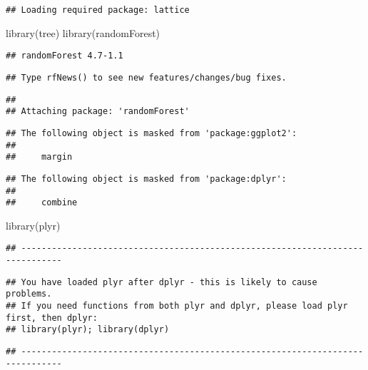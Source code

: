 \documentclass[
]{article}
\newenvironment{Shaded}{\begin{snugshade}}{\end{snugshade}}
\newcommand{\FunctionTok}[1]{\textcolor[rgb]{0.00,0.00,0.00}{#1}}
\newcommand{\NormalTok}[1]{#1}
\begin{document}
\begin{verbatim}
## Loading required package: lattice
\end{verbatim}

\begin{Shaded}
\begin{Highlighting}[]
\FunctionTok{library}\NormalTok{(tree)}
\FunctionTok{library}\NormalTok{(randomForest)}
\end{Highlighting}
\end{Shaded}

\begin{verbatim}
## randomForest 4.7-1.1
\end{verbatim}

\begin{verbatim}
## Type rfNews() to see new features/changes/bug fixes.
\end{verbatim}

\begin{verbatim}
## 
## Attaching package: 'randomForest'
\end{verbatim}

\begin{verbatim}
## The following object is masked from 'package:ggplot2':
## 
##     margin
\end{verbatim}

\begin{verbatim}
## The following object is masked from 'package:dplyr':
## 
##     combine
\end{verbatim}

\begin{Shaded}
\begin{Highlighting}[]
\FunctionTok{library}\NormalTok{(plyr)}
\end{Highlighting}
\end{Shaded}

\begin{verbatim}
## ------------------------------------------------------------------------------
\end{verbatim}

\begin{verbatim}
## You have loaded plyr after dplyr - this is likely to cause problems.
## If you need functions from both plyr and dplyr, please load plyr first, then dplyr:
## library(plyr); library(dplyr)
\end{verbatim}

\begin{verbatim}
## ------------------------------------------------------------------------------
\end{verbatim}
\end{document}
